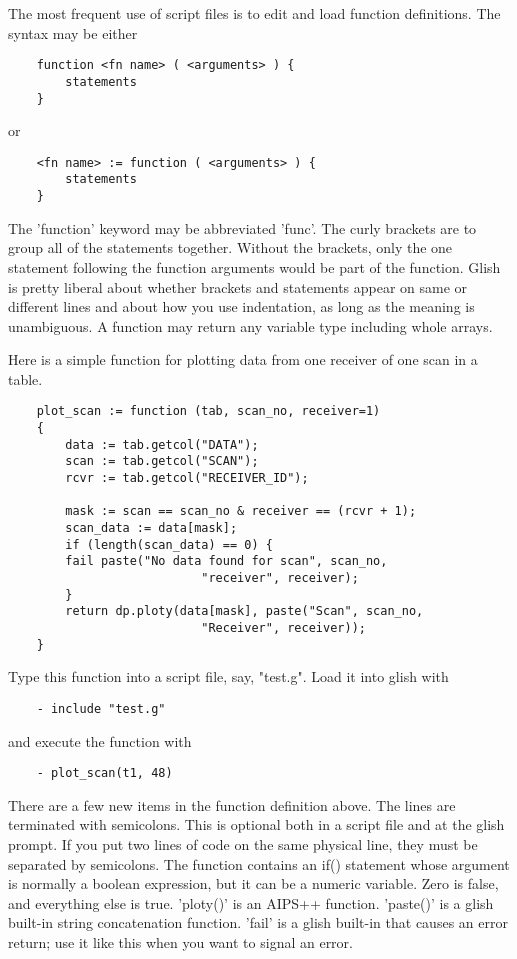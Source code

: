The most frequent use of script files is to edit and load function
definitions.  The syntax may be either

\begin{verbatim}
	function <fn name> ( <arguments> ) {
	    statements
	}
\end{verbatim}
or
\begin{verbatim}
	<fn name> := function ( <arguments> ) {
	    statements
	}
\end{verbatim}

The 'function' keyword may be abbreviated 'func'.  The curly brackets are
to group all of the statements together.  Without the brackets, only the
one statement following the function arguments would be part of the
function.  Glish is pretty liberal about whether brackets and statements
appear on same or different lines and about how you use indentation, as
long as the meaning is unambiguous.  A function may return any variable
type including whole arrays.

    Here is a simple function for plotting data from one receiver of one
scan in a table.

\begin{verbatim}
	plot_scan := function (tab, scan_no, receiver=1)
	{
	    data := tab.getcol("DATA");
	    scan := tab.getcol("SCAN");
	    rcvr := tab.getcol("RECEIVER_ID");

	    mask := scan == scan_no & receiver == (rcvr + 1);
	    scan_data := data[mask];
	    if (length(scan_data) == 0) {
		fail paste("No data found for scan", scan_no, 
                           "receiver", receiver);
	    }
	    return dp.ploty(data[mask], paste("Scan", scan_no, 
                           "Receiver", receiver));
	}
\end{verbatim}

Type this function into a script file, say, "test.g".  Load it into glish
with

\begin{verbatim}
	- include "test.g"
\end{verbatim}

and execute the function with

\begin{verbatim}
	- plot_scan(t1, 48)
\end{verbatim}

    There are a few new items in the function definition above.  The lines
are terminated with semicolons.  This is optional both in a script file and
at the glish prompt.  If you put two lines of code on the same physical
line, they must be separated by semicolons.  The function contains an if()
statement whose argument is normally a boolean expression, but it can be a
numeric variable.  Zero is false, and everything else is true.  'ploty()'
is an AIPS++ function.  'paste()' is a glish built-in string concatenation
function. 'fail' is a glish built-in that causes an error return; use
it like this when you want to signal an error.

